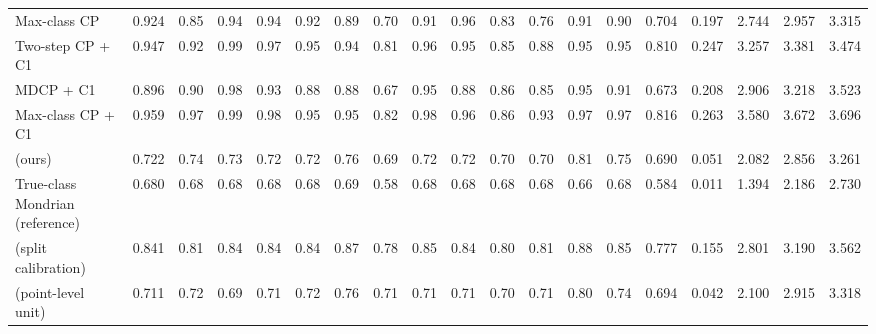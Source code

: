 \begin{table}[!htbp]
{\begin{tabular}{lcccccccccccccccccc}
Max-class CP & 0.924 & 0.85 & 0.94 & 0.94 & 0.92 & 0.89 & 0.70 & 0.91 & 0.96 & 0.83 & 0.76 & 0.91 & 0.90 & 0.704 & 0.197 & 2.744 & 2.957 & 3.315 \\
Two-step CP + C1 & 0.947 & 0.92 & 0.99 & 0.97 & 0.95 & 0.94 & 0.81 & 0.96 & 0.95 & 0.85 & 0.88 & 0.95 & 0.95 & 0.810 & 0.247 & 3.257 & 3.381 & 3.474 \\
MDCP + C1 & 0.896 & 0.90 & 0.98 & 0.93 & 0.88 & 0.88 & 0.67 & 0.95 & 0.88 & 0.86 & 0.85 & 0.95 & 0.91 & 0.673 & 0.208 & 2.906 & 3.218 & 3.523 \\
Max-class CP + C1 & 0.959 & 0.97 & 0.99 & 0.98 & 0.95 & 0.95 & 0.82 & 0.98 & 0.96 & 0.86 & 0.93 & 0.97 & 0.97 & 0.816 & 0.263 & 3.580 & 3.672 & 3.696 \\
\gamut{} (ours) & 0.722 & 0.74 & 0.73 & 0.72 & 0.72 & 0.76 & 0.69 & 0.72 & 0.72 & 0.70 & 0.70 & 0.81 & 0.75 & 0.690 & 0.051 & 2.082 & 2.856 & 3.261 \\
True-class Mondrian (reference) & 0.680 & 0.68 & 0.68 & 0.68 & 0.68 & 0.69 & 0.58 & 0.68 & 0.68 & 0.68 & 0.68 & 0.66 & 0.68 & 0.584 & 0.011 & 1.394 & 2.186 & 2.730 \\
\gamut{} (split calibration) & 0.841 & 0.81 & 0.84 & 0.84 & 0.84 & 0.87 & 0.78 & 0.85 & 0.84 & 0.80 & 0.81 & 0.88 & 0.85 & 0.777 & 0.155 & 2.801 & 3.190 & 3.562 \\
\gamut{} (point-level unit) & 0.711 & 0.72 & 0.69 & 0.71 & 0.72 & 0.76 & 0.71 & 0.71 & 0.71 & 0.70 & 0.71 & 0.80 & 0.74 & 0.694 & 0.042 & 2.100 & 2.915 & 3.318 \\
\bottomrule
\end{tabular}}
\end{table}
\FloatBarrier

